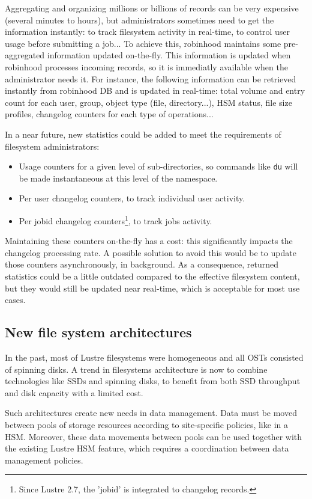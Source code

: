 \documentclass[conference]{IEEEtran}
\begin{document}
Aggregating and organizing millions or billions of records can be very expensive (several minutes to hours),
but administrators sometimes need to get the information instantly: to track filesystem activity in real-time, to control user usage before submitting a job...
To achieve this, robinhood maintains some pre-aggregated information updated on-the-fly. This information is updated when robinhood processes incoming records, so it is immediatly available when the administrator needs it.
For instance, the following information can be retrieved instantly from robinhood DB and is updated in real-time:
total volume and entry count for each user, group, object type (file, directory...), HSM status,
file size profiles, changelog counters for each type of operations...

In a near future, new statistics could be added to meet the requirements of filesystem administrators:
\begin{itemize}
\item Usage counters for a given level of sub-directories, so commands like {\tt du} will be made instantaneous at this level of the namespace.
\item Per user changelog counters, to track individual user activity.
\item Per jobid changelog counters\footnote{Since Lustre 2.7, the 'jobid' is integrated to changelog records.}, to track jobs activity.
\end{itemize}

Maintaining these counters on-the-fly has a cost: this significantly impacts the changelog processing rate.
A possible solution to avoid this would be to update those counters asynchronously, in background.
As a consequence, returned statistics could be a little outdated compared to the effective filesystem content, but they would still be updated near real-time, which is acceptable for most use cases.

\subsection{New file system architectures}

In the past, most of Lustre filesystems were homogeneous and all OSTs consisted of spinning disks.
A trend in filesystems architecture is now to combine technologies like SSDs and spinning disks,
to benefit from both SSD throughput and disk capacity with a limited cost.

Such architectures create new needs in data management. Data must be moved between pools
of storage resources according to site-specific policies, like in a HSM.
Moreover, these data movements between pools can be used together with the existing Lustre HSM feature,
which requires a coordination between data management policies.
\end{document}
